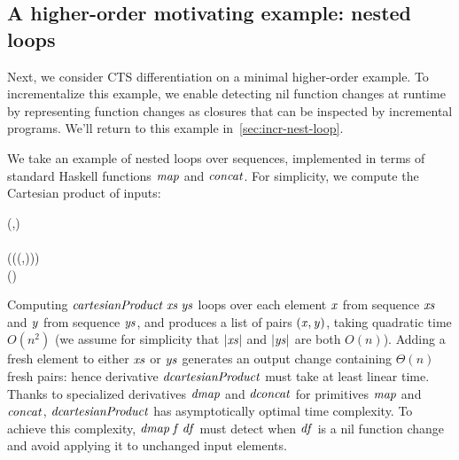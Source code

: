 \subsection{A higher-order motivating example: nested loops}
\label{sec:higher-order-example}

Next, we consider CTS differentiation on a minimal higher-order
example. To incrementalize this example, we enable detecting nil function
changes at runtime by representing function changes as closures that can be
inspected by incremental programs. We'll return to this example
in~\cref{sec:incr-nest-loop}.

We take an example of nested loops over sequences, implemented in terms of
standard Haskell functions \ensuremath{\Varid{map}} and \ensuremath{\Varid{concat}}. For simplicity, we compute the
Cartesian product of inputs:
\begin{hscode}\SaveRestoreHook
{}%
%
%
%
\>[3]{}\mathrel{:\mkern-1mu:}\;\to {}\;\to {}\;(,){}\<[E]%
\\
\>[3]{}\;\;\mathrel{=}{}\<[E]%
\\
\>[3]{}\<[5]%
\>[5]{}\;(\lambda {}\to {}\;(\lambda {}\to (,))\;)\;\<[E]%
\\
\>[3]{}\;\;\mathrel{=}\;(\;\;){}\<[E]%
\ColumnHook
\end{hscode}\resethooks
Computing \ensuremath{\Varid{cartesianProduct}\;\Varid{xs}\;\Varid{ys}} loops over each element \ensuremath{\Varid{x}} from sequence
\ensuremath{\Varid{xs}} and \ensuremath{\Varid{y}} from sequence \ensuremath{\Varid{ys}}, and produces a list of pairs \ensuremath{(\Varid{x},\Varid{y})}, taking
quadratic time $O(n^2)$ (we assume for simplicity that \ensuremath{\left|{\Varid{xs}}\right|} and \ensuremath{\left|{\Varid{ys}}\right|}
are both $O(n)$).
Adding a fresh element to either
\ensuremath{\Varid{xs}} or \ensuremath{\Varid{ys}} generates an output change containing $\Theta(n)$ fresh pairs:
hence derivative \ensuremath{\Varid{dcartesianProduct}} must take at least linear time. Thanks to
specialized derivatives \ensuremath{\Varid{dmap}} and \ensuremath{\Varid{dconcat}} for primitives \ensuremath{\Varid{map}} and \ensuremath{\Varid{concat}},
\ensuremath{\Varid{dcartesianProduct}} has asymptotically optimal time complexity. To achieve this
complexity, \ensuremath{\Varid{dmap}\;\Varid{f}\;\Varid{df}} must detect when \ensuremath{\Varid{df}} is a nil function change and avoid
applying it to unchanged input elements.

